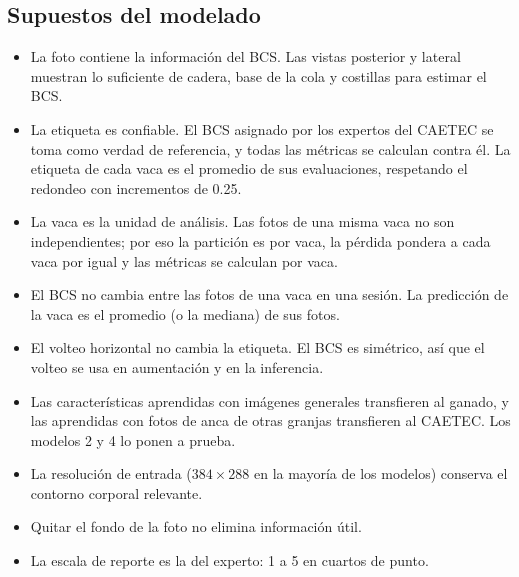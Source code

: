 \subsection{Supuestos del modelado}

\begin{itemize}
  \item La foto contiene la información del BCS. Las vistas posterior y lateral muestran lo suficiente de cadera, base de la cola y costillas para estimar el BCS.
  \item La etiqueta es confiable. El BCS asignado por los expertos del CAETEC se toma como verdad de referencia, y todas las métricas se calculan contra él. La etiqueta de cada vaca es el promedio de sus evaluaciones, respetando el redondeo con incrementos de 0.25.
  \item La vaca es la unidad de análisis. Las fotos de una misma vaca no son independientes; por eso la partición es por vaca, la pérdida pondera a cada vaca por igual y las métricas se calculan por vaca.
  \item El BCS no cambia entre las fotos de una vaca en una sesión. La predicción de la vaca es el promedio (o la mediana) de sus fotos.
  \item El volteo horizontal no cambia la etiqueta. El BCS es simétrico, así que el volteo se usa en aumentación y en la inferencia.
  \item Las características aprendidas con imágenes generales transfieren al ganado, y las aprendidas con fotos de anca de otras granjas transfieren al CAETEC. Los modelos 2 y 4 lo ponen a prueba.
  \item La resolución de entrada ($384\times288$ en la mayoría de los modelos) conserva el contorno corporal relevante.
  \item Quitar el fondo de la foto no elimina información útil.
  \item La escala de reporte es la del experto: 1 a 5 en cuartos de punto.
\end{itemize}
